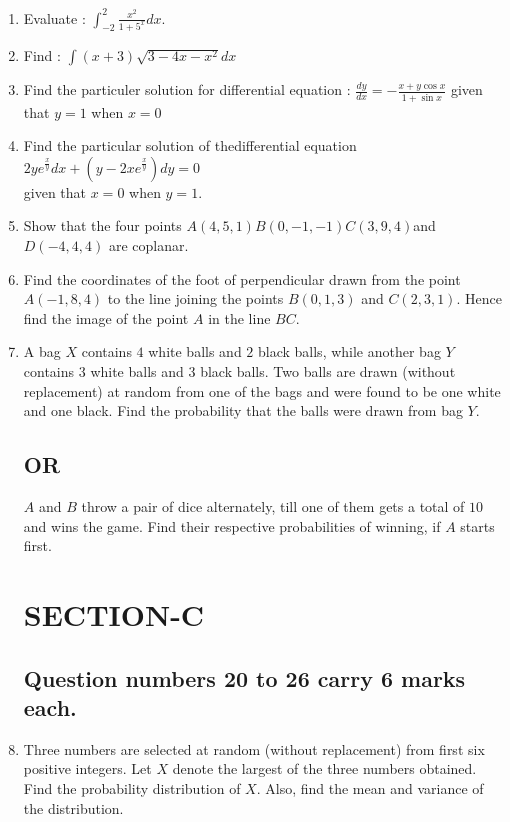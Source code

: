 \documentclass{article}
\begin{document}
\begin{enumerate}
	\item Evaluate : $\int_{-2}^{2}\frac{x^2}{1+5^x}dx$.

	\item Find : $\int{(x+3)\sqrt{3-4x-x^2}}dx$
	
	\item Find the particuler solution for differential equation : $\frac{dy}{dx}=-\frac{x+y\cos x}{1+\sin x}$ given that $y=1$ when $x=0$
	
	\item Find the particular solution of thedifferential equation $2ye^\frac{x}{y}dx+(y-2xe^\frac{x}{y})dy=0$\\given that $x=0$ when $y=1$.
	
	\item Show that the four points $A(4, 5, 1) B(0, -1, -1) C(3, 9, 4)$and $D(-4, 4, 4)$ are coplanar.
    
	\item Find the coordinates of the foot of perpendicular drawn from the point $A(-1, 8, 4)$ to the line joining the points $B(0, 1, 3)$ and $C(2,3,1)$. Hence find the image of the point $A$ in the line $BC$.
    
	\item A bag $X$ contains $4$ white balls and $2$ black balls, while another bag $Y$ contains $3$ white balls and $3$ black balls. Two balls are drawn (without replacement) at random from one of the bags and were found to be one white and one black. Find the probability that the balls were drawn from bag $Y$.
	
		\subsection*{\centering OR}

     $A$ and $B$ throw a pair of dice alternately, till one of them gets a total of $10$ and wins the game. Find their respective probabilities of winning, if $A$ starts first.

         \section*{\centering SECTION-C}
	\subsection*{\centering Question numbers 20 to 26 carry 6 marks  each.}	

\item Three numbers are selected at random (without replacement) from first six positive integers. Let $X$ denote the largest of the three numbers obtained. Find the probability distribution of $X$. Also, find the mean and variance of the distribution.


\end{enumerate}
\end{document}
